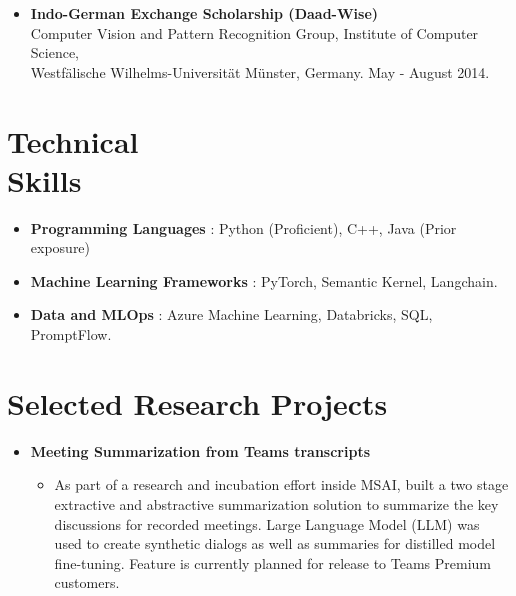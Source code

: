 \documentclass[margin,line]{resume}
\begin{document}
\begin{resume}
\begin{itemize}
\item \textbf{Indo-German Exchange Scholarship (Daad-Wise)} \\ Computer Vision and Pattern Recognition Group, Institute of Computer Science, \\ Westf\"alische Wilhelms-Universit\"at M\"unster, Germany.
\hfill May - August 2014.

\end{itemize}

\section{\mysidestyle Technical\\Skills} 
\begin{itemize}
\vspace{-0.5pt}
\item \textbf{Programming Languages} : Python (Proficient), C++, Java (Prior exposure)
\item \textbf{Machine Learning Frameworks} : PyTorch, Semantic Kernel, Langchain.
\item \textbf{Data and MLOps} : Azure Machine Learning, Databricks, SQL, PromptFlow.
\end{itemize}


\section{\mysidestyle Selected Research Projects} 

\begin{itemize} 
\vspace{-0.5pt}

\item \textbf{Meeting Summarization from Teams transcripts}
\begin{itemize}  
\vspace{-0.5pt}
\item As part of a research and incubation effort inside MSAI, built a two stage extractive and abstractive summarization solution to summarize the key discussions for recorded meetings. Large Language Model (LLM) was used to create synthetic dialogs as well as summaries for distilled model fine-tuning. Feature is currently planned for release to Teams Premium customers.
\end{itemize}


\end{itemize}
\end{resume}
\end{document}
